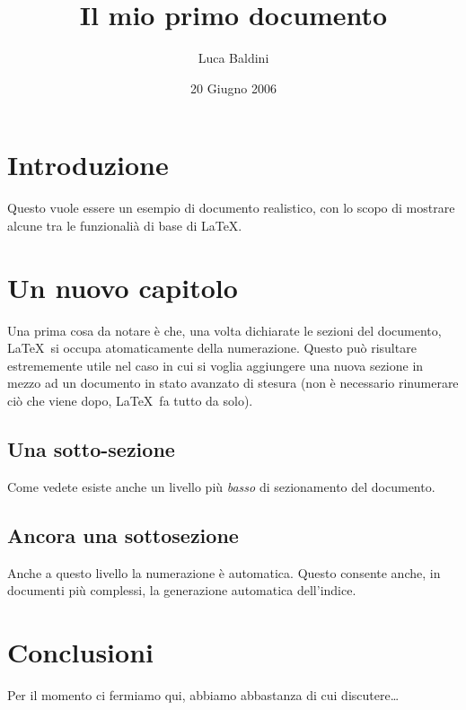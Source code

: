 \documentclass[11pt, a4paper]{article}
\title{Il mio primo documento}
\author{Luca Baldini}
\date{20 Giugno 2006}
\begin{document}
\maketitle

\section{Introduzione}
Questo vuole essere un esempio di documento realistico, con lo scopo
di mostrare alcune tra le funzionali\`a di base di \LaTeX.

\section{Un nuovo capitolo}
Una prima cosa da notare \`e che, una volta dichiarate le sezioni del
documento, \LaTeX\ si occupa atomaticamente della numerazione. Questo
pu\`o risultare estrememente utile nel caso in cui si voglia aggiungere
una nuova sezione in mezzo ad un documento in stato avanzato di stesura
(non \`e necessario rinumerare ci\`o che viene dopo, \LaTeX\ fa
tutto da solo). 

\subsection{Una sotto-sezione}
Come vedete esiste anche un livello pi\`u \emph{basso} di sezionamento
del documento.

\subsection{Ancora una sottosezione}
Anche a questo livello la numerazione \`e automatica. Questo consente
anche, in documenti pi\`u complessi, la generazione automatica dell'indice.

\section{Conclusioni}
Per il momento ci fermiamo qui, abbiamo abbastanza di cui discutere\ldots
\end{document}
